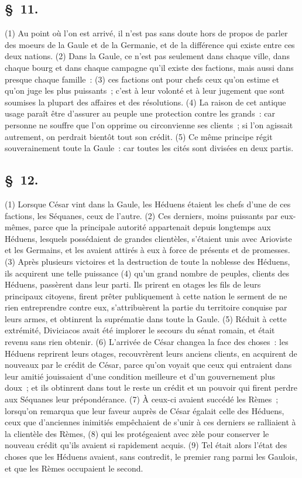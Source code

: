\documentclass[french,twoside]{book} %
\begin{document}
\subsection[{§ 11.}]{ \textsc{§ 11.} }
\noindent (1) Au point où l’on est arrivé, il n’est pas sans doute hors de propos de parler des moeurs de la Gaule et de la Germanie, et de la différence qui existe entre ces deux nations. (2) Dans la Gaule, ce n’est pas seulement dans chaque ville, dans chaque bourg et dans chaque campagne qu’il existe des factions, mais aussi dans presque chaque famille : (3) ces factions ont pour chefs ceux qu’on estime et qu’on juge les plus puissants ; c’est à leur volonté et à leur jugement que sont soumises la plupart des affaires et des résolutions. (4) La raison de cet antique usage paraît être d’assurer au peuple une protection contre les grands : car personne ne souffre que l’on opprime ou circonvienne ses clients ; si l’on agissait autrement, on perdrait bientôt tout son crédit. (5) Ce même principe régit souverainement toute la Gaule : car toutes les cités sont divisées en deux partis.
\subsection[{§ 12.}]{ \textsc{§ 12.} }
\noindent (1) Lorsque César vint dans la Gaule, les Héduens étaient les chefs d’une de ces factions, les Séquanes, ceux de l’autre. (2) Ces derniers, moins puissants par eux-mêmes, parce que la principale autorité appartenait depuis longtemps aux Héduens, lesquels possédaient de grandes clientèles, s’étaient unis avec Arioviste et les Germains, et les avaient attirés à eux à force de présents et de promesses. (3) Après plusieurs victoires et la destruction de toute la noblesse des Héduens, ils acquirent une telle puissance (4) qu’un grand nombre de peuples, clients des Héduens, passèrent dans leur parti. Ils prirent en otages les fils de leurs principaux citoyens, firent prêter publiquement à cette nation le serment de ne rien entreprendre contre eux, s’attribuèrent la partie du territoire conquise par leurs armes, et obtinrent la suprématie dans toute la Gaule. (5) Réduit à cette extrémité, Diviciacos avait été implorer le secours du sénat romain, et était revenu sans rien obtenir. (6) L'arrivée de César changea la face des choses : les Héduens reprirent leurs otages, recouvrèrent leurs anciens clients, en acquirent de nouveaux par le crédit de César, parce qu’on voyait que ceux qui entraient dans leur amitié jouissaient d’une condition meilleure et d’un gouvernement plus doux ; et ils obtinrent dans tout le reste un crédit et un pouvoir qui firent perdre aux Séquanes leur prépondérance. (7) À ceux-ci avaient succédé les Rèmes ; lorsqu’on remarqua que leur faveur auprès de César égalait celle des Héduens, ceux que d’anciennes inimitiés empêchaient de s’unir à ces derniers se ralliaient à la clientèle des Rèmes, (8) qui les protégeaient avec zèle pour conserver le nouveau crédit qu’ils avaient si rapidement acquis. (9) Tel était alors l’état des choses que les Héduens avaient, sans contredit, le premier rang parmi les Gaulois, et que les Rèmes occupaient le second.
\end{document}
